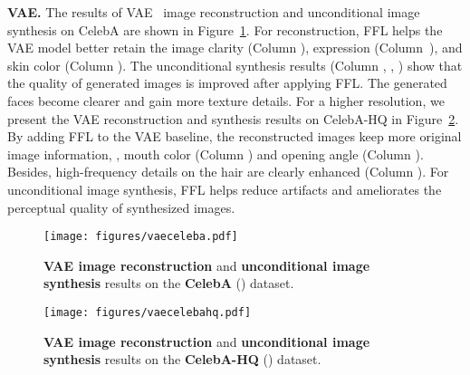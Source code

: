 \documentclass[10pt,twocolumn,letterpaper]{article}
\begin{document}
\vspace{0.05cm}
\noindent
\textbf{VAE.}
The results of VAE~\cite{vae} image reconstruction and unconditional image synthesis on CelebA are shown in Figure~\ref{fig:vaeceleba}.
For reconstruction, FFL helps the VAE model better retain the image clarity (Column ), expression (Column~), and skin color (Column ).
The unconditional synthesis results (Column , , ) show that the quality of generated images is improved after applying FFL. The generated faces become clearer and gain more texture details.
For a higher resolution, we present the VAE reconstruction and synthesis results on CelebA-HQ in Figure~\ref{fig:vaecelebahq}.
By adding FFL to the VAE baseline, the reconstructed images keep more original image information, \eg, mouth color (Column ) and opening angle (Column ). Besides, high-frequency details on the hair are clearly enhanced (Column ).
For unconditional image synthesis, FFL helps reduce artifacts and ameliorates the perceptual quality of synthesized images.


\begin{figure}[t]
	\centering
	\vspace{-0.2cm}
	\texttt{[image: figures/vaeceleba.pdf]}
\caption{\textbf{VAE image reconstruction} and \textbf{unconditional image synthesis} results on the \textbf{CelebA} () dataset.}
	\label{fig:vaeceleba}
	\vspace{-0.35cm}
\end{figure}





\begin{figure}[t]
	\centering
\texttt{[image: figures/vaecelebahq.pdf]}
	\vspace{-0.05cm}
	\caption{\textbf{VAE image reconstruction} and \textbf{unconditional image synthesis} results on the \textbf{CelebA-HQ} () dataset.}
	\label{fig:vaecelebahq}
	\vspace{-0.12cm}
\end{figure}
\end{document}

